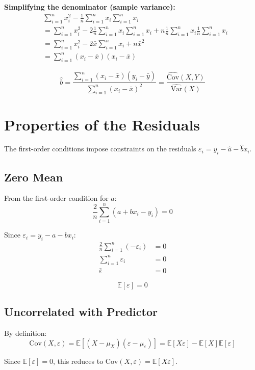 \documentclass[main.tex]{subfiles}
\begin{document}
\textbf{Simplifying the denominator (sample variance):}
\begin{align}
&\sum_{i=1}^{n} x_i^2 - \frac{1}{n}\sum_{i=1}^{n} x_i\sum_{i=1}^{n} x_i \\[8pt]
&= \sum_{i=1}^{n} x_i^2 - 2\frac{1}{n}\sum_{i=1}^{n} x_i\sum_{i=1}^{n} x_i + n\frac{1}{n}\sum_{i=1}^{n} x_i\frac{1}{n}\sum_{i=1}^{n} x_i \\[8pt]
&= \sum_{i=1}^{n} x_i^2 - 2\bar{x}\sum_{i=1}^{n} x_i + n\bar{x}^2 \\[8pt]
&= \sum_{i=1}^{n} (x_i - \bar{x})(x_i - \bar{x})
\end{align}

$$\boxed{\hat{b} = \frac{\displaystyle\sum_{i=1}^{n} (x_i - \bar{x})(y_i - \bar{y})}{\displaystyle\sum_{i=1}^{n} (x_i - \bar{x})^2} = \frac{\widehat{\text{Cov}}(X, Y)}{\widehat{\text{Var}}(X)}}$$

\needspace{0.33\textheight}
\section{Properties of the Residuals}

The first-order conditions impose constraints on the residuals $\varepsilon_i = y_i - \hat{a} - \hat{b}x_i$.

\subsection{Zero Mean}

From the first-order condition for $a$:
$$\frac{2}{n}\sum_{i=1}^{n}(a + bx_i - y_i) = 0$$

Since $\varepsilon_i = y_i - a - bx_i$:
\begin{align}
\frac{2}{n}\sum_{i=1}^{n}(-\varepsilon_i) &= 0 \\[8pt]
\sum_{i=1}^{n}\varepsilon_i &= 0 \\[8pt]
\bar{\varepsilon} &= 0
\end{align}

$$\boxed{\mathbb{E}[\varepsilon] = 0}$$

\subsection{Uncorrelated with Predictor}

\begin{samepage}
By definition:
$$\text{Cov}(X, \varepsilon) = \mathbb{E}[(X - \mu_X)(\varepsilon - \mu_\varepsilon)] = \mathbb{E}[X\varepsilon] - \mathbb{E}[X]\mathbb{E}[\varepsilon]$$

Since $\mathbb{E}[\varepsilon] = 0$, this reduces to $\text{Cov}(X, \varepsilon) = \mathbb{E}[X\varepsilon]$.
\end{samepage}
\end{document}
